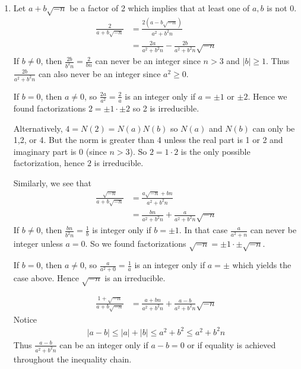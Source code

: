 \documentclass[12pt,class=article,crop=false]{standalone}
\begin{document}
\begin{problem}[4]
~\begin{enumerate}[label=(\alph*)]
	\item Let $ a+b\sqrt{-n} $ be a factor of 2 which implies that at least one of $ a,b$ is not $ 0$.
		\begin{align*}
			\frac{2}{a+b\sqrt{-n} } &= \frac{2(a-b\sqrt{-n} )}{a^2+b^2n } \\
			&= \frac{2a}{a^2+b^2n } - \frac{2b}{a^2+b^2n} \sqrt{-n} 
		\end{align*}
If $ b \neq 0$, then  $ \frac{2b}{ b^2n} = \frac{2}{bn}$ can never be an integer since $ n>3$ and $ |b|\geq 1$. Thus $ \frac{2b}{a^2+b^2n }$ can also never be an integer since $ a^2\geq 0$.

If $ b=0$, then  $ a \neq 0$, so  $\frac{2a}{a^2} =\frac{2}{a}$ is an integer only if $ a=\pm 1$ or $ \pm 2$. Hence we found factorizations $ 2 = \pm 1 \cdot \pm 2$ so 2 is irreducible.

Alternatively, $ 4= N(2) = N(a)N(b)$ so  $ N(a)$ and  $ N(b)$ can only be 1,2, or 4. But the norm is greater than 4 unless the real part is 1 or 2 and imaginary part is 0 (since  $ n>3$). So  $ 2=1 \cdot 2$ is the only possible factorization, hence $ 2$ is irreducible.

Similarly, we see that
\begin{align*}
	\frac{\sqrt{-n} }{ a+b\sqrt{-n} } &= \frac{a\sqrt{-n} +bn}{ a^2+b^2n} \\
	&= \frac{bn}{ a^2+b^2n} + \frac{a}{a^2+b^2n}\sqrt{-n} 
\end{align*}
If $ b \neq 0$, then  $ \frac{bn}{b^2n} = \frac{1}{b}$ is integer only if $ b = \pm 1$. In that case  $ \frac{a}{a^2+n}$ can never be integer unless $ a=0$. So we found factorizations $\sqrt{-n} = \pm 1 \cdot \pm \sqrt{-n}$.

If $ b=0$, then  $ a\neq 0$, so  $ \frac{a}{a^2+0} = \frac{1}{a}$ is an integer only if $ a = \pm$ which yields the case above. Hence $ \sqrt{-n} $ is an irreducible.

\begin{align*}
	\frac{1+\sqrt{-n} }{ a+b\sqrt{-n} } &= \frac{a+bn}{ a^2+b^2n} + \frac{a-b}{ a^2+b^2n} \sqrt{-n}  
\end{align*}
Notice
\begin{align*}
	|a-b| \leq |a|+|b| \leq a^2+b^2 \leq a^2+b^2n
\end{align*}
Thus $ \frac{a-b}{ a^2+b^2n}$ can be an integer only if $ a-b=0$ or if equality is achieved throughout the inequality chain. 


\end{enumerate}
\end{problem}
\end{document}
